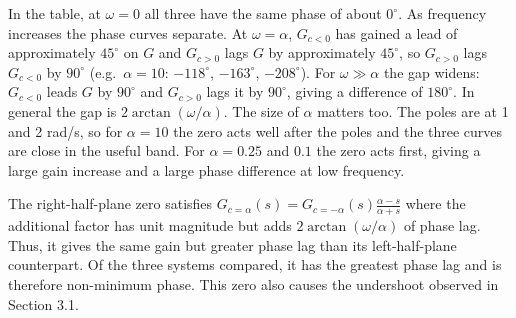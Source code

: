 In the table, at $\omega=0$ all three have the same phase of about $0^\circ$. As frequency increases the phase curves separate. At $\omega=\alpha$, $G_{c<0}$ has gained a lead of approximately $45^\circ$ on $G$ and $G_{c>0}$ lags $G$ by approximately $45^\circ$, so $G_{c>0}$ lags $G_{c<0}$ by $90^\circ$ (e.g.\ $\alpha=10$: $-118^\circ$, $-163^\circ$, $-208^\circ$). For $\omega\gg\alpha$ the gap widens: $G_{c<0}$ leads $G$ by $90^\circ$ and $G_{c>0}$ lags it by $90^\circ$, giving a difference of $180^\circ$. In general the gap is $2\arctan(\omega/\alpha)$. The size of $\alpha$ matters too. The poles are at 1 and 2 rad/s, so for $\alpha=10$ the zero 
acts well after the poles and the three curves are close in the useful band. For $\alpha=0.25$ and $0.1$ the zero acts first, giving a large gain increase and a large phase difference at low frequency. \newline

The right-half-plane zero satisfies $G_{c=\alpha}(s)=G_{c=-\alpha}(s)\frac{\alpha-s}{\alpha+s}$
where the additional factor has unit magnitude but adds \(2\arctan(\omega/\alpha)\) of phase lag. Thus, it gives the same gain but greater phase lag than its left-half-plane counterpart. Of the three systems compared, it has the greatest phase lag and is therefore non-minimum phase. This zero also causes the undershoot observed in Section 3.1.